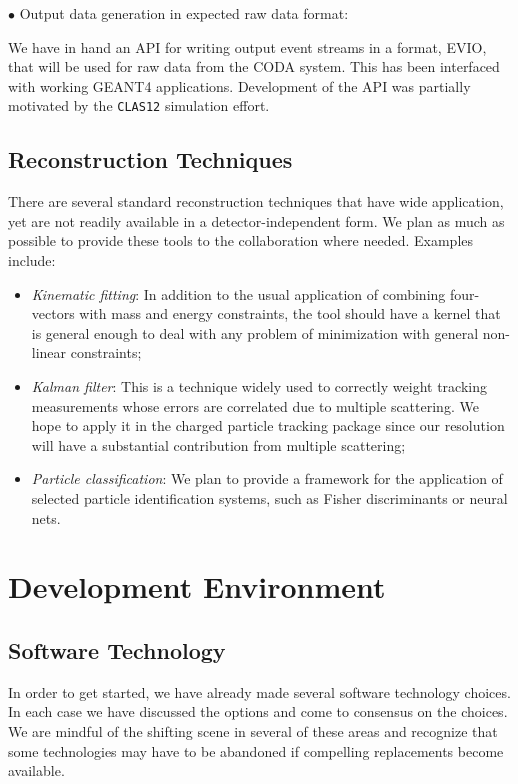\vskip 0.3cm

\noindent
$\bullet$ Output data generation in expected raw data format:

We have in hand an API for writing output event streams in a format, EVIO, 
that will be used for raw data from the CODA system. This has been interfaced 
with working GEANT4 applications. Development of the API was partially 
motivated by the {\tt CLAS12} simulation effort.

\subsection{Reconstruction Techniques}

There are several standard reconstruction techniques that have wide 
application, yet are not readily available in a detector-independent form. 
We plan as much as possible to provide these tools to the collaboration 
where needed. Examples include:

\begin{itemize}
\item {\it Kinematic fitting}: In addition to the usual application of 
combining four-vectors with mass and energy constraints, the tool should 
have a kernel that is general enough to deal with any problem of 
minimization with general non-linear constraints;
\item {\it Kalman filter}: This is a technique widely used to correctly 
weight tracking measurements whose errors are correlated due to multiple 
scattering.  We hope to apply it in the charged particle tracking package 
since our resolution will have a substantial contribution from multiple 
scattering;
\item {\it Particle classification}: We plan to provide a framework for the 
application of selected particle identification systems, such as Fisher 
discriminants or neural nets.
\end{itemize}

\section{Development Environment}

\subsection{Software Technology}

In order to get started, we have already made several software technology 
choices. In each case we have discussed the options and come to consensus on 
the choices. We are mindful of the shifting scene in several of these areas 
and recognize that some technologies may have to be abandoned if compelling 
replacements become available.

